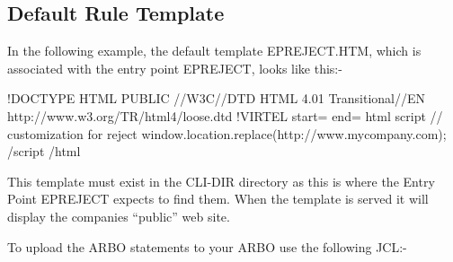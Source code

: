 \documentclass[letterpaper,10pt,english]{sphinxmanual}
\begin{document}
\ignorespaces 

\subsection{Default Rule Template}
\label{\detokenize{connectivity_guide:default-rule-template}}\label{\detokenize{connectivity_guide:index-190}}
In the following example, the default template EPREJECT.HTM, which is associated with the entry point EPREJECT, looks like this:-

\begin{sphinxVerbatim}[commandchars=\\\{\}]
\PYGZlt{}!DOCTYPE HTML PUBLIC \PYGZdq{}\PYGZhy{}//W3C//DTD HTML 4.01 Transitional//EN\PYGZdq{}
\PYGZdq{}http://www.w3.org/TR/html4/loose.dtd\PYGZdq{}\PYGZgt{}
\PYGZlt{}!\PYGZhy{}\PYGZhy{}VIRTEL start=\PYGZdq{}\PYGZob{}\PYGZob{}\PYGZob{}\PYGZdq{} end=\PYGZdq{}\PYGZcb{}\PYGZcb{}\PYGZcb{}\PYGZdq{} \PYGZhy{}\PYGZhy{}\PYGZgt{}
\PYGZlt{}html\PYGZgt{}
\PYGZlt{}script\PYGZgt{}
// customization for reject
window.location.replace(\PYGZdq{}http://www.mycompany.com\PYGZdq{});
\PYGZlt{}/script\PYGZgt{}
\PYGZlt{}/html\PYGZgt{}
\end{sphinxVerbatim}

This template must exist in the CLI-DIR directory as this is where the Entry Point EPREJECT expects to find them. When the template is served it will display the companies “public” web site.

To upload the ARBO statements to your ARBO use the following JCL:-
\end{document}
